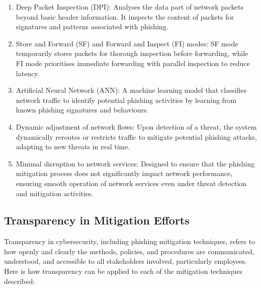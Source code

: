 \begin{enumerate}
    \item Deep Packet Inspection (DPI): Analyses the data part of network packets beyond basic header information. It inspects the content of packets for signatures and patterns associated with phishing.
    \item Store and Forward (SF) and Forward and Inspect (FI) modes: SF mode temporarily stores packets for thorough inspection before forwarding, while FI mode prioritises immediate forwarding with parallel inspection to reduce latency.
    \item Artificial Neural Network (ANN): A machine learning model that classifies network traffic to identify potential phishing activities by learning from known phishing signatures and behaviours.
    \item Dynamic adjustment of network flows: Upon detection of a threat, the system dynamically reroutes or restricts traffic to mitigate potential phishing attacks, adapting to new threats in real time.
    \item Minimal disruption to network services: Designed to ensure that the phishing mitigation process does not significantly impact network performance, ensuring smooth operation of network services even under threat detection and mitigation activities.
\end{enumerate}

\subsection{Transparency in Mitigation Efforts}

Transparency in cybersecurity, including phishing mitigation techniques, refers to how openly and clearly the methods, policies, and procedures are communicated, understood, and accessible to all stakeholders involved, particularly employees. Here is how transparency can be applied to each of the mitigation techniques described:


